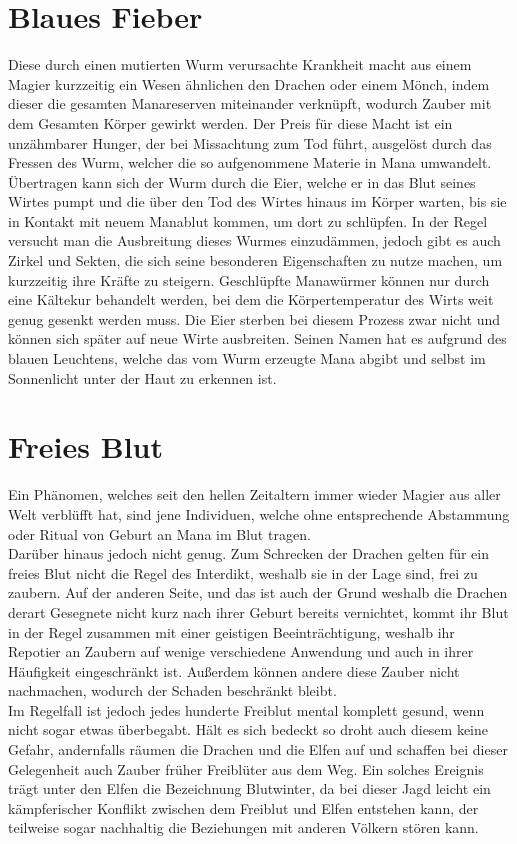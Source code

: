 \documentclass[a4paper,12pt,oneside]{book}
\begin{document}
\section{Blaues Fieber}
Diese durch einen mutierten Wurm verursachte Krankheit macht aus einem Magier kurzzeitig ein Wesen ähnlichen den Drachen oder einem Mönch, indem dieser die gesamten Manareserven miteinander verknüpft, wodurch Zauber mit dem Gesamten Körper gewirkt werden. Der Preis für diese Macht ist ein unzähmbarer Hunger, der bei Missachtung zum Tod führt, ausgelöst durch das Fressen des Wurm, welcher die so aufgenommene Materie in Mana umwandelt. Übertragen kann sich der Wurm durch die Eier, welche er in das Blut seines Wirtes pumpt und die über den Tod des Wirtes hinaus im Körper warten, bis sie in Kontakt mit neuem Manablut kommen, um dort zu schlüpfen. In der Regel versucht man die Ausbreitung dieses Wurmes einzudämmen, jedoch gibt es auch Zirkel und Sekten, die sich seine besonderen Eigenschaften zu nutze machen, um kurzzeitig ihre Kräfte zu steigern. Geschlüpfte Manawürmer können nur durch eine Kältekur behandelt werden, bei dem die Körpertemperatur des Wirts weit genug gesenkt werden muss. Die Eier sterben bei diesem Prozess zwar nicht und können sich später auf neue Wirte ausbreiten. Seinen Namen hat es aufgrund des blauen Leuchtens, welche das vom Wurm erzeugte Mana abgibt und selbst im Sonnenlicht unter der Haut zu erkennen ist.
\section{Freies Blut}
Ein Phänomen, welches seit den hellen Zeitaltern immer wieder Magier aus aller Welt verblüfft hat, sind jene Individuen, welche ohne entsprechende Abstammung oder Ritual von Geburt an Mana im Blut tragen.  
\\Darüber hinaus jedoch nicht genug. Zum Schrecken der Drachen gelten für ein freies Blut nicht die Regel des Interdikt, weshalb sie in der Lage sind, frei zu zaubern. Auf der anderen Seite, und das ist auch der Grund weshalb die Drachen derart Gesegnete nicht kurz nach ihrer Geburt bereits vernichtet, kommt ihr Blut in der Regel zusammen mit einer geistigen Beeinträchtigung, weshalb ihr Repotier an Zaubern auf wenige verschiedene Anwendung und auch in ihrer Häufigkeit eingeschränkt ist. Außerdem können andere diese Zauber nicht nachmachen, wodurch der Schaden beschränkt bleibt.
\\Im Regelfall ist jedoch jedes hunderte Freiblut mental komplett gesund, wenn nicht sogar etwas überbegabt. Hält es sich bedeckt so droht auch diesem keine Gefahr, andernfalls räumen die Drachen und die Elfen auf und schaffen bei dieser Gelegenheit auch Zauber früher Freiblüter aus dem Weg. Ein solches Ereignis trägt unter den Elfen die Bezeichnung Blutwinter, da bei dieser Jagd leicht ein kämpferischer Konflikt zwischen dem Freiblut und Elfen entstehen kann, der teilweise sogar nachhaltig die Beziehungen mit anderen Völkern stören kann.  
\end{document}
